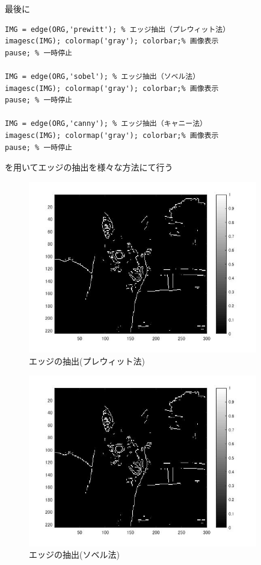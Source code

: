 \documentclass{jsarticle}
\begin{document}
最後に
\begin{lstlisting}[basicstyle=\ttfamily\footnotesize, frame=single]
IMG = edge(ORG,'prewitt'); % エッジ抽出（プレウィット法）
imagesc(IMG); colormap('gray'); colorbar;% 画像表示
pause; % 一時停止

IMG = edge(ORG,'sobel'); % エッジ抽出（ソベル法）
imagesc(IMG); colormap('gray'); colorbar;% 画像表示
pause; % 一時停止

IMG = edge(ORG,'canny'); % エッジ抽出（キャニー法）
imagesc(IMG); colormap('gray'); colorbar;% 画像表示
pause; % 一時停止
 \end{lstlisting}
を用いてエッジの抽出を様々な方法にて行う

\newpage
\begin{figure}[htbp]
 \begin{center}
  \includegraphics[width=10cm]{8-1.jpg}
 \end{center}
 \caption{エッジの抽出(プレウィット法)}
\end{figure}

\newpage
\begin{figure}[htbp]
 \begin{center}
  \includegraphics[width=10cm]{8-2.jpg}
 \end{center}
 \caption{エッジの抽出(ソベル法)}
\end{figure}
\end{document}
